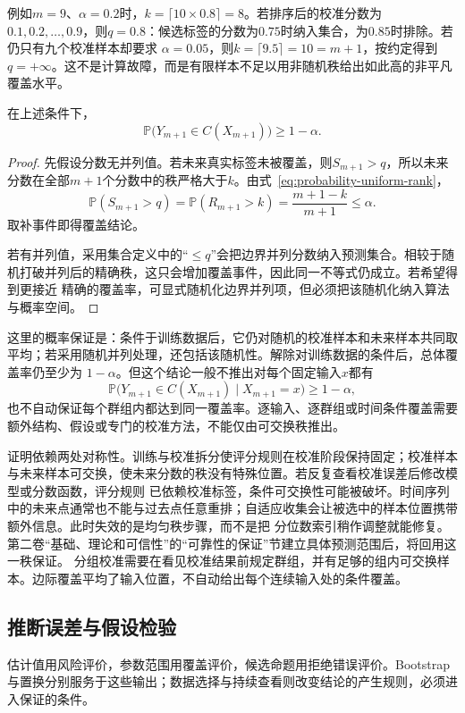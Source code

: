 例如\(m=9\)、\(\alpha=0.2\)时，\(k=\lceil10\times0.8\rceil=8\)。若排序后的校准分数为
\(0.1,0.2,\ldots,0.9\)，则\(q=0.8\)：候选标签的分数为\(0.75\)时纳入集合，为\(0.85\)时排除。若仍只有九个校准样本却要求
\(\alpha=0.05\)，则\(k=\lceil9.5\rceil=10=m+1\)，按约定得到\(q=+\infty\)。这不是计算故障，而是有限样本不足以用非随机秩给出如此高的非平凡覆盖水平。

\begin{theorem}[拆分共形的有限样本覆盖]
\label{thm:probability-split-conformal-coverage}
在上述条件下，
\[ \mathbb{P}\bigl(
    Y_{m+1}\in C(X_{m+1})\bigr)\geq 1-\alpha. \]
\end{theorem}

\begin{proof}
先假设分数无并列值。若未来真实标签未被覆盖，则\(S_{m+1}>q\)，所以未来分数在全部\(m+1\)个分数中的秩严格大于\(k\)。由式~\eqref{eq:probability-uniform-rank}，
\[ \mathbb{P}(S_{m+1}>q)
  =\mathbb{P}(R_{m+1}>k)=\frac{m+1-k}{m+1}\leq\alpha. \]
取补事件即得覆盖结论。

若有并列值，采用集合定义中的“\(\leq q\)”会把边界并列分数纳入预测集合。相较于随机打破并列后的精确秩，这只会增加覆盖事件，因此同一不等式仍成立。若希望得到更接近
精确的覆盖率，可显式随机化边界并列项，但必须把该随机化纳入算法与概率空间。
\end{proof}

这里的概率保证是：条件于训练数据后，它仍对随机的校准样本和未来样本共同取平均；若采用随机并列处理，还包括该随机性。解除对训练数据的条件后，总体覆盖率仍至少为
\(1-\alpha\)。但这个结论一般不推出对每个固定输入\(x\)都有
\[
  \mathbb{P}\bigl(
    Y_{m+1}\in C(X_{m+1})
    \mid X_{m+1}=x
  \bigr)
  \geq1-\alpha,
\]
也不自动保证每个群组内都达到同一覆盖率。逐输入、逐群组或时间条件覆盖需要额外结构、假设或专门的校准方法，不能仅由可交换秩推出。

证明依赖两处对称性。训练与校准拆分使评分规则在校准阶段保持固定；校准样本与未来样本可交换，使未来分数的秩没有特殊位置。若反复查看校准误差后修改模型或分数函数，评分规则
已依赖校准标签，条件可交换性可能被破坏。时间序列中的未来点通常也不能与过去点任意重排；自适应收集会让被选中的样本位置携带额外信息。此时失效的是均匀秩步骤，而不是把
分位数索引稍作调整就能修复。
{第二卷“基础、理论和可信性”的“可靠性的保证”节}建立具体预测范围后，将回用这一秩保证。
分组校准需要在看见校准结果前规定群组，并有足够的组内可交换样本。边际覆盖平均了输入位置，不自动给出每个连续输入处的条件覆盖。

\subsection{推断误差与假设检验}
\label{sec:stats-uncertainty-testing-selection}
估计值用风险评价，参数范围用覆盖评价，候选命题用拒绝错误评价。Bootstrap与置换分别服务于这些输出；数据选择与持续查看则改变结论的产生规则，必须进入保证的条件。

